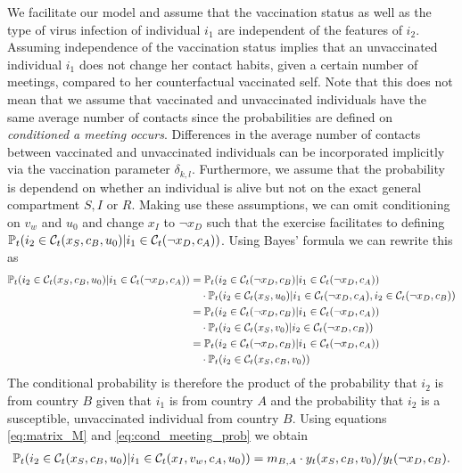 We facilitate our model and assume that the vaccination status as well as the type of virus infection of individual $i_1$ are independent of the features of $i_2$. Assuming independence of the vaccination status implies that an unvaccinated individual $i_1$ does not change her contact habits, given a certain number of meetings, compared to her counterfactual vaccinated self. Note that this does not mean that we assume that vaccinated and unvaccinated individuals have the same average number of contacts since the probabilities are defined on \textit{conditioned a meeting occurs}. Differences in the average number of contacts between vaccinated and unvaccinated individuals can be incorporated implicitly via the vaccination parameter $\delta_{k,l}$. Furthermore, we assume that the probability is dependend on whether an individual is alive but not on the exact general compartment $S, I$ or $R$. Making use these assumptions, we can omit conditioning on $v_w$ and $u_0$ and change $x_I$ to $\neg x_D$ such that the exercise facilitates to defining $\mathbb{P}_t(i_2 \in \mathcal{C}_t(x_S, c_B, u_0)|i_1 \in \mathcal{C}_t(\neg x_D, c_A))$. Using Bayes' formula we can rewrite this as
\begin{align}
\label{eq:cond_meeting_prob}
\mathbb{P}_t(i_2 \in \mathcal{C}_t(x_S, c_B, u_0)|i_1 \in \mathcal{C}_t(\neg x_D, c_A)) &= \mathbb{P}_t(i_2 \in \mathcal{C}_t(\neg x_D, c_B) | i_1 \in \mathcal{C}_t(\neg x_D, c_A) )  \notag \\
& \quad \cdot \mathbb{P}_t(i_2 \in \mathcal{C}_t(x_S, u_0) | i_1 \in \mathcal{C}_t(\neg x_D, c_A), i_2 \in \mathcal{C}_t(\neg x_D, c_B) ) \notag \\
&= \mathbb{P}_t(i_2 \in \mathcal{C}_t(\neg x_D, c_B) | i_1 \in \mathcal{C}_t(\neg x_D, c_A) )  \notag \\
& \quad \cdot \mathbb{P}_t(i_2 \in \mathcal{C}_t(x_S, v_0)|i_2 \in \mathcal{C}_t(\neg x_D, c_B)) \notag\\
&= \mathbb{P}_t(i_2 \in \mathcal{C}_t(\neg x_D, c_B) | i_1 \in \mathcal{C}_t(\neg x_D, c_A) ) \notag \\
& \quad \cdot \mathbb{P}_t(i_2 \in \mathcal{C}_t(x_S, c_B, v_0))
\end{align} 
The conditional probability is therefore the product of the probability that $i_2$ is from country $B$ given that $i_1$ is from country $A$ and the probability that $i_2$ is a susceptible, unvaccinated individual from country $B$. Using equations \eqref{eq:matrix_M} and \eqref{eq:cond_meeting_prob} we obtain
\begin{align}
\label{eq:cond_prob_meeting_final}
\mathbb{P}_t(i_2 \in \mathcal{C}_t(x_S, c_B, u_0)|i_1 \in \mathcal{C}_t(x_I, v_w, c_A, u_0)) = m_{B,A} \cdot y_t(x_S, c_B, v_0) / y_t(\neg x_D, c_B). 
\end{align}

